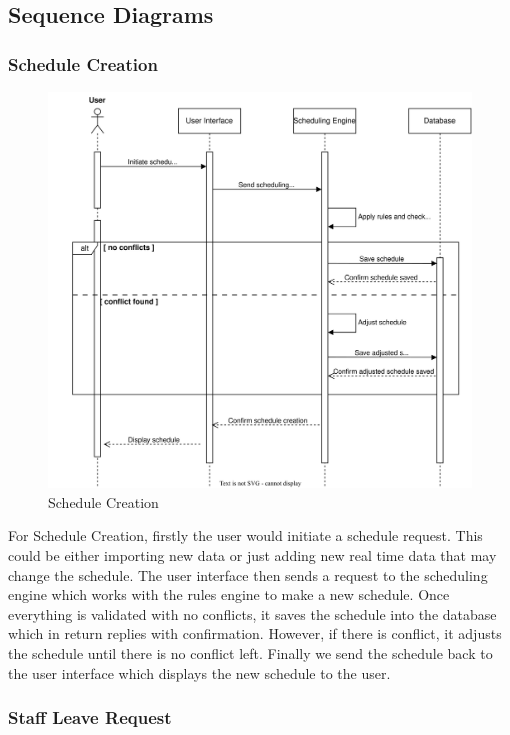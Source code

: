 \documentclass[a4paper,12pt, oneside]{report}
\begin{document}
\subsection{Sequence Diagrams}
\subsubsection{Schedule Creation}
\begin{figure}[H]
    \centering
    \includegraphics[width=\linewidth]{UMLDiagrams/scheduleCreation_white.jpg}
    \caption{Schedule Creation}
    \label{fig:schedule-creation}
\end{figure}
For Schedule Creation, firstly the user would initiate a schedule request. This could be either importing new data or just adding new real time data that may change the schedule. The user interface then sends a request to the scheduling engine which works with the rules engine to make a new schedule. Once everything is validated with no conflicts, it saves the schedule into the database which in return replies with confirmation. However, if there is conflict, it adjusts the schedule until there is no conflict left. Finally we send the schedule back to the user interface which displays the new schedule to the user.

\subsubsection{Staff Leave Request}
\end{document}

